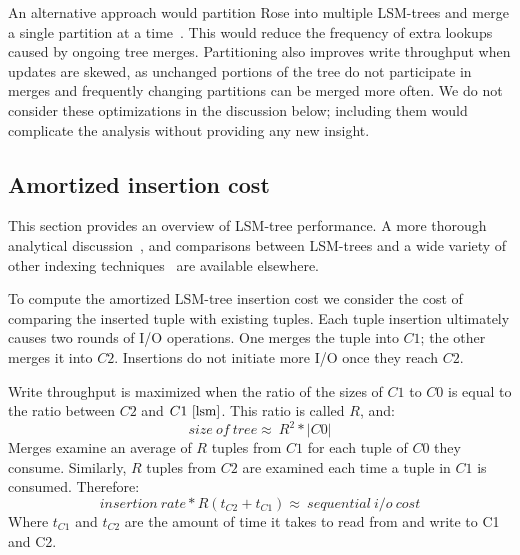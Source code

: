 \documentclass{vldb}
\newcommand{\rows}{Rose\xspace}
\begin{document}

An alternative approach would partition \rows into multiple LSM-trees and
merge a single partition at a time~\cite{partexp}.  This would reduce
the frequency of extra lookups caused by ongoing tree merges.
Partitioning also improves write throughput when updates are skewed,
as unchanged portions of the tree do not participate in merges and
frequently changing partitions can be merged more often.  We do not
consider these optimizations in the discussion below; including them
would complicate the analysis without providing any new insight.

\subsection{Amortized insertion cost}

This section provides an overview of LSM-tree performance.  A more
thorough analytical discussion~\cite{lsm}, and 
comparisons between LSM-trees and a wide variety of other indexing
techniques~\cite{partexp} are available elsewhere.

To compute the amortized LSM-tree insertion cost
we consider the cost of comparing the inserted tuple with
existing tuples.  Each tuple insertion ultimately causes two rounds of I/O
operations.  One merges the tuple into $C1$; the other merges it into
$C2$.  Insertions do not initiate more I/O once they reach $C2$.

Write throughput is maximized when the ratio of the
sizes of $C1$ to $C0$ is equal to the ratio between $C2$ and
$C1~\cite{lsm}$.  This ratio is called $R$, and:
\[size~of~tree\approx~R^2*|C0|\]
Merges examine an average of $R$ tuples from $C1$ for each tuple
of $C0$ they consume.  Similarly, $R$ tuples from $C2$ are examined
each time a tuple in $C1$ is consumed.  Therefore: %
\[insertion~rate*R(t_{C2}+t_{C1})\approx~sequential~i/o~cost\]
Where $t_{C1}$ and $t_{C2}$ are the amount of time it takes to read
from and write to C1 and C2.

\end{document}
